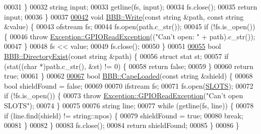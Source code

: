 \begin{DoxyCode}
00031   \}
00032   \textcolor{keywordtype}{string} input;
00033   getline(fs, input);
00034   fs.close();
00035   \textcolor{keywordflow}{return} input;
00036 \}
00037 
\hypertarget{_b_b_b_8cpp_source_l00042}{}\hyperlink{class_hardware_1_1_b_b_b_a155cc06f76d82a6b690ce5ea08e7c68e}{00042} \textcolor{keywordtype}{void} \hyperlink{class_hardware_1_1_b_b_b_a155cc06f76d82a6b690ce5ea08e7c68e}{BBB::Write}(\textcolor{keyword}{const} \textcolor{keywordtype}{string} &path, \textcolor{keyword}{const} \textcolor{keywordtype}{string} &value) \{
00043   ofstream fs;
00044   fs.open(path.c\_str());
00045   \textcolor{keywordflow}{if} (!fs.is\_open()) \{
00046     \textcolor{keywordflow}{throw} \hyperlink{class_hardware_1_1_exception_1_1_g_p_i_o_read_exception}{Exception::GPIOReadException}((\textcolor{stringliteral}{"Can't open: "} + path).c\_str());
00047   \}
00048   fs << value;
00049   fs.close();
00050 \}
00051 
\hypertarget{_b_b_b_8cpp_source_l00055}{}\hyperlink{class_hardware_1_1_b_b_b_adf431d8e0e8899f7aa16c350a2270e79}{00055} \textcolor{keywordtype}{bool} \hyperlink{class_hardware_1_1_b_b_b_adf431d8e0e8899f7aa16c350a2270e79}{BBB::DirectoryExist}(\textcolor{keyword}{const} \textcolor{keywordtype}{string} &path) \{
00056   \textcolor{keyword}{struct }stat st;
00057   \textcolor{keywordflow}{if} (stat((\textcolor{keywordtype}{char} *)path.c\_str(), &st) != 0) \{
00058     \textcolor{keywordflow}{return} \textcolor{keyword}{false};
00059   \}
00060   \textcolor{keywordflow}{return} \textcolor{keyword}{true};
00061 \}
00062 
\hypertarget{_b_b_b_8cpp_source_l00067}{}\hyperlink{class_hardware_1_1_b_b_b_aaf2f732c771eac0b1ee984dbc0bca784}{00067} \textcolor{keywordtype}{bool} \hyperlink{class_hardware_1_1_b_b_b_aaf2f732c771eac0b1ee984dbc0bca784}{BBB::CapeLoaded}(\textcolor{keyword}{const} \textcolor{keywordtype}{string} &shield) \{
00068   \textcolor{keywordtype}{bool} shieldFound = \textcolor{keyword}{false};
00069 
00070   ifstream fs;
00071   fs.open(\hyperlink{_b_b_b_8h_a3de26a5dbd2276c1486afbba5fc8de59}{SLOTS});
00072   \textcolor{keywordflow}{if} (!fs.is\_open()) \{
00073     \textcolor{keywordflow}{throw} \hyperlink{class_hardware_1_1_exception_1_1_g_p_i_o_read_exception}{Exception::GPIOReadException}(\textcolor{stringliteral}{"Can't open SLOTS"});
00074   \}
00075 
00076   \textcolor{keywordtype}{string} line;
00077   \textcolor{keywordflow}{while} (getline(fs, line)) \{
00078     \textcolor{keywordflow}{if} (line.find(shield) != string::npos) \{
00079       shieldFound = \textcolor{keyword}{true};
00080       \textcolor{keywordflow}{break};
00081     \}
00082   \}
00083   fs.close();
00084   \textcolor{keywordflow}{return} shieldFound;
00085 \}
00086 \}
\end{DoxyCode}
